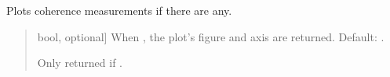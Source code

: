 \documentclass[letterpaper,10pt,english]{sphinxmanual}
\begin{document}
\begin{fulllineitems}
\begin{fulllineitems}
\label{\detokenize{classes:dsptoolbox.classes.signal_class.Signal.plot_coherence}}
\pysigstartsignatures
{}
\pysigstopsignatures
\sphinxAtStartPar
Plots coherence measurements if there are any.
\begin{quote}\begin{description}
\begin{description}
\sphinxlineitem{\sphinxstylestrong{returns}}{[}bool, optional{]}
\sphinxAtStartPar
When , the plot’s figure and axis are returned.
Default: .

\end{description}

\begin{description}
\sphinxAtStartPar
Only returned if .

\end{description}

\end{description}\end{quote}

\end{fulllineitems}



\end{fulllineitems}
\end{document}

